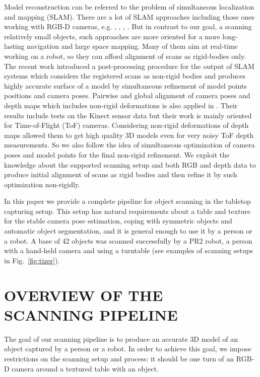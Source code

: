 \documentclass[letterpaper, 10 pt, conference]{ieeeconf}  %
\begin{document}
Model reconstruction can be referred to the problem of simultaneous localization
and mapping (SLAM). There are a lot of SLAM approaches including those ones working
with RGB-D cameras, e.g. \cite{stuckler2012integrating},
\cite{endres2012evaluation}, \cite{henry2012rgb}, \cite{strasdat2011double}. But in contrast to our goal,
a scanning relatively small objects, such approaches are more oriented for
a more long-lasting navigation and large space mapping. Many of them aim at
real-time working on a robot, so they can afford alignment of scans 
as rigid-bodies only. 
The recent work \cite{ruhnke2012highly} introduced a post-processing procedure for the output of SLAM systems
which considers the registered scans as non-rigid bodies and produces highly accurate
surface of a model by simultaneous refinement of model points positions and camera poses.
Pairwise and global alignment of camera poses and depth maps which includes non-rigid 
deformations is also applied in \cite{cui2012algorithms}. Their results include tests on the Kinect
sensor data but their work is mainly oriented for Time-of-Flight (ToF) cameras. Considering non-rigid deformations 
of depth maps allowed them to get high quality 3D models even for very noisy ToF depth measurements.
So we also follow the idea of simultaneous optimization of camera poses and model points 
for the final non-rigid refinement. We exploit the knowledge 
about the supported scanning setup and both RGB and depth 
data to produce initial alignment of scans as rigid bodies
and then refine it by such optimization non-rigidly.

In this paper we provide a complete pipeline for object scanning
in the tabletop capturing setup. This setup has natural requirements
about a table and texture for the stable camera pose estimation,
coping with symmetric objects and automatic object segmentation, and it is general enough
to use it by a person or a robot. A base of 42 objects was
scanned successfully by a PR2 robot, a person with a hand-held camera 
and using a turntable (see examples of scanning setups 
in Fig.~\ref{fig:tizer}).


\section{OVERVIEW OF THE SCANNING PIPELINE}

The goal of our scanning pipeline is to produce an accurate 3D model
of an object captured by a person or a robot.
In order to achieve this goal, we
impose restrictions on the scanning setup and process: it should be
one turn of an RGB-D camera around a textured table with an object. 
\end{document}
